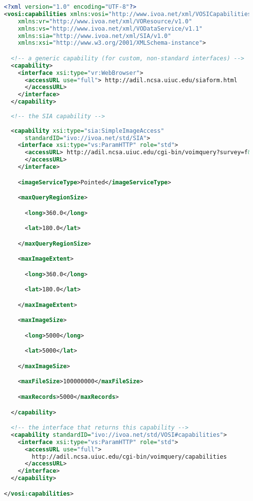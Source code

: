 \documentclass[11pt,letter]{ivoa}
\begin{document}
\begin{lstlisting}[language=XML,basicstyle=\footnotesize]
<?xml version="1.0" encoding="UTF-8"?>
<vosi:capabilities xmlns:vosi="http://www.ivoa.net/xml/VOSICapabilities/v1.0"
    xmlns:vr="http://www.ivoa.net/xml/VOResource/v1.0"
    xmlns:vs="http://www.ivoa.net/xml/VODataService/v1.1"
    xmlns:sia="http://www.ivoa.net/xml/SIA/v1.0"
    xmlns:xsi="http://www.w3.org/2001/XMLSchema-instance">

  <!-- a generic capability (for custom, non-standard interfaces) -->
  <capability>
    <interface xsi:type="vr:WebBrowser">
      <accessURL use="full"> http://adil.ncsa.uiuc.edu/siaform.html 
      </accessURL>
    </interface>
  </capability>
  
  <!-- the SIA capability -->
 
  <capability xsi:type="sia:SimpleImageAccess" 
      standardID="ivo://ivoa.net/std/SIA">
    <interface xsi:type="vs:ParamHTTP" role="std">
      <accessURL> http://adil.ncsa.uiuc.edu/cgi-bin/voimquery?survey=f&amp; 
      </accessURL>
    </interface>

    <imageServiceType>Pointed</imageServiceType>

    <maxQueryRegionSize>

      <long>360.0</long>

      <lat>180.0</lat>

    </maxQueryRegionSize>

    <maxImageExtent>

      <long>360.0</long>

      <lat>180.0</lat>

    </maxImageExtent>

    <maxImageSize>

      <long>5000</long>

      <lat>5000</lat>

    </maxImageSize>

    <maxFileSize>100000000</maxFileSize>

    <maxRecords>5000</maxRecords>

  </capability>

  <!-- the interface that returns this capability -->
  <capability standardID="ivo://ivoa.net/std/VOSI#capabilities">
    <interface xsi:type="vs:ParamHTTP" role="std">
      <accessURL use="full"> 
        http://adil.ncsa.uiuc.edu/cgi-bin/voimquery/capabilities 
      </accessURL>
    </interface>
  </capability>

</vosi:capabilities>
\end{lstlisting}
\end{document}
